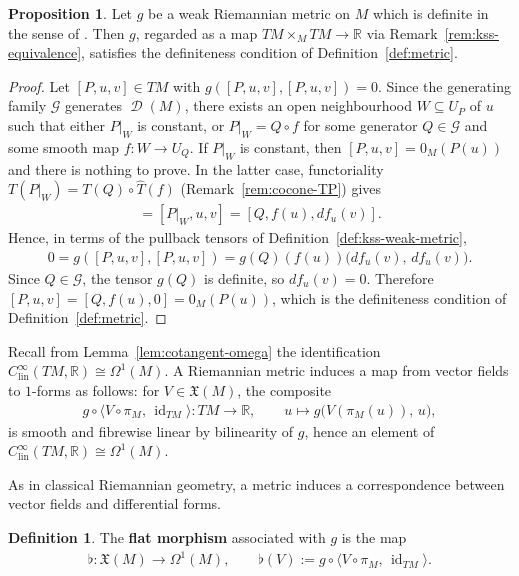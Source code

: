 \documentclass{amsart}
\newcommand{\R}{\mathbb{R}}
\newcommand{\Clin}{C^{\infty}_{\mathrm{lin}}}
\DeclareMathOperator{\D}{\mathcal{D}}
\DeclareMathOperator{\id}{id}
\theoremstyle{definition}
\newtheorem{defn}[thm]{Definition}
\newtheorem{prop}[thm]{Proposition}
\begin{document}
\begin{prop}\label{prop:kss-definite-implies-definite}
  Let $g$ be a weak Riemannian metric on $M$ which is definite in the
  sense of \cite{KSS}. Then $g$, regarded as a map
  $TM \times_M TM \to \R$ via Remark~\ref{rem:kss-equivalence},
  satisfies the definiteness condition of Definition~\ref{def:metric}.
\end{prop}

\begin{proof}
  Let $[P, u, v] \in TM$ with $g([P, u, v], [P, u, v]) = 0$.
  Since the generating family $\mathcal{G}$ generates $\D(M)$, there exists
  an open neighbourhood $W \subseteq U_P$ of $u$ such that either $P|_W$ is
  constant, or $P|_W = Q \circ f$ for some generator
  $Q \in \mathcal{G}$ and some smooth map $f \colon W \to U_Q$.
  If $P|_W$ is constant, then $[P, u, v] = 0_M(P(u))$ and there is nothing
  to prove. In the latter case, functoriality
  $T(P|_W) = T(Q) \circ \hat{T}(f)$ (Remark~\ref{rem:cocone-TP}) gives
  \begin{align*}
    [P, u, v] = [P|_W, u, v] = [Q, f(u), df_u(v)].
  \end{align*}
  Hence, in terms of the pullback tensors of
  Definition~\ref{def:kss-weak-metric},
  \begin{align*}
    0 = g([P, u, v], [P, u, v])
      = g(Q)(f(u))\bigl(df_u(v),\, df_u(v)\bigr).
  \end{align*}
  Since $Q \in \mathcal{G}$, the tensor $g(Q)$ is definite, so
  $df_u(v) = 0$. Therefore
  $[P, u, v] = [Q, f(u), 0] = 0_M(P(u))$,
  which is the definiteness condition of Definition~\ref{def:metric}.
\end{proof}

Recall from Lemma~\ref{lem:cotangent-omega} the identification
$\Clin(TM, \R) \cong \Omega^1(M)$. A Riemannian metric induces a
map from vector fields to $1$-forms as follows: for $V \in \mathfrak{X}(M)$,
the composite
\begin{align*}
  g \circ \langle V \circ \pi_M,\, \id_{TM} \rangle \colon TM \to \R,
  \qquad u \longmapsto g\bigl(V(\pi_M(u)),\, u\bigr),
\end{align*}
is smooth and fibrewise linear by bilinearity of $g$, hence an element of
$\Clin(TM,\R) \cong \Omega^1(M)$.

As in classical Riemannian geometry, a metric induces a correspondence between vector fields and differential forms.

\begin{defn}\label{def:flat}
The \textbf{flat morphism} associated with $g$ is the map
\begin{align*}
  \flat \colon \mathfrak{X}(M) \to \Omega^1(M),
  \qquad
  \flat(V) := g \circ \langle V \circ \pi_M,\, \id_{TM} \rangle.
\end{align*}
\end{defn}
\end{document}
